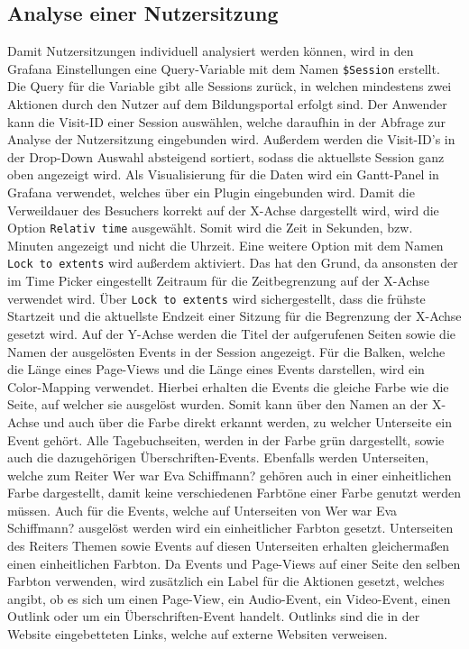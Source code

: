 \subsection{Analyse einer Nutzersitzung}
Damit Nutzersitzungen individuell analysiert werden können, wird in den Grafana Einstellungen eine Query-Variable mit dem Namen \texttt{\$Session} erstellt. Die Query für die Variable gibt alle Sessions zurück, in welchen mindestens zwei Aktionen durch den Nutzer auf dem Bildungsportal erfolgt sind. Der Anwender kann die Visit-ID einer Session auswählen, welche daraufhin in der Abfrage zur Analyse der Nutzersitzung eingebunden wird. Außerdem werden die Visit-ID's in der Drop-Down Auswahl absteigend sortiert, sodass die aktuellste Session ganz oben angezeigt wird. Als Visualisierung für die Daten wird ein Gantt-Panel in Grafana verwendet, welches über ein Plugin eingebunden wird. Damit die Verweildauer des Besuchers korrekt auf der X-Achse dargestellt wird, wird die Option \texttt{Relativ time} ausgewählt. Somit wird die Zeit in Sekunden, bzw. Minuten angezeigt und nicht die Uhrzeit. Eine weitere Option mit dem Namen \texttt{Lock to extents} wird außerdem aktiviert. Das hat den Grund, da ansonsten der im Time Picker eingestellt Zeitraum für die Zeitbegrenzung auf der X-Achse verwendet wird. Über \texttt{Lock to extents} wird sichergestellt, dass die frühste Startzeit und die aktuellste Endzeit einer Sitzung für die Begrenzung der X-Achse gesetzt wird. Auf der Y-Achse werden die Titel der aufgerufenen Seiten sowie die Namen der ausgelösten Events in der Session angezeigt. Für die Balken, welche die Länge eines Page-Views und die Länge eines Events darstellen, wird ein Color-Mapping verwendet. Hierbei erhalten die Events die gleiche Farbe wie die Seite, auf welcher sie ausgelöst wurden. Somit kann über den Namen an der X-Achse und auch über die Farbe direkt erkannt werden, zu welcher Unterseite ein Event gehört. Alle Tagebuchseiten, werden in der Farbe grün dargestellt, sowie auch die dazugehörigen Überschriften-Events. Ebenfalls werden Unterseiten, welche zum Reiter \glqq Wer war Eva Schiffmann?\grqq{} gehören auch in einer einheitlichen Farbe dargestellt, damit keine verschiedenen Farbtöne einer Farbe genutzt werden müssen. Auch für die Events, welche auf Unterseiten von \glqq Wer war Eva Schiffmann?\grqq{} ausgelöst werden wird ein einheitlicher Farbton gesetzt. Unterseiten des Reiters \glqq Themen\grqq{} sowie Events auf diesen Unterseiten erhalten gleichermaßen einen einheitlichen Farbton. Da Events und Page-Views auf einer Seite den selben Farbton verwenden, wird zusätzlich ein Label für die Aktionen gesetzt, welches angibt, ob es sich um einen Page-View, ein Audio-Event, ein Video-Event, einen Outlink oder um ein Überschriften-Event handelt. Outlinks sind die in der Website eingebetteten Links, welche auf externe Websiten verweisen.

